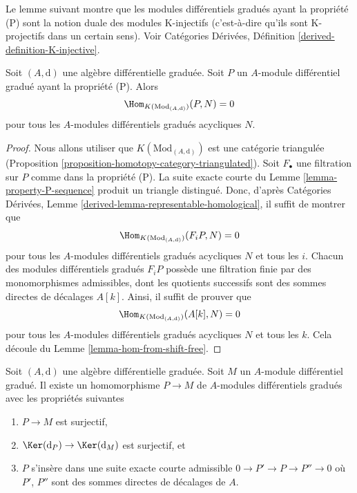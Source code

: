 \noindent
Le lemme suivant montre que les modules différentiels gradués ayant la propriété
(P) sont la notion duale des modules K-injectifs (c'est-à-dire qu'ils sont
K-projectifs dans un certain sens). Voir Catégories Dérivées, Définition
\ref{derived-definition-K-injective}.

\begin{lemma}
\label{lemma-property-P-K-projective}
Soit $(A, \text{d})$ une algèbre différentielle graduée. Soit $P$ un $A$-module
différentiel gradué ayant la propriété (P). Alors
$$
\Hom_{K(\text{Mod}_{(A, \text{d})})}(P, N) = 0
$$
pour tous les $A$-modules différentiels gradués acycliques $N$.
\end{lemma}

\begin{proof}
Nous allons utiliser que $K(\text{Mod}_{(A, \text{d})})$ est une catégorie
triangulée (Proposition \ref{proposition-homotopy-category-triangulated}). Soit
$F_\bullet$ une filtration sur $P$ comme dans la propriété (P). La suite exacte
courte du Lemme \ref{lemma-property-P-sequence} produit un triangle distingué.
Donc, d'après Catégories Dérivées, Lemme
\ref{derived-lemma-representable-homological}, il suffit de montrer que
$$
\Hom_{K(\text{Mod}_{(A, \text{d})})}(F_iP, N) = 0
$$
pour tous les $A$-modules différentiels gradués acycliques $N$ et tous les $i$.
Chacun des modules différentiels gradués $F_iP$ possède une filtration finie par
des monomorphismes admissibles, dont les quotients successifs sont des sommes directes
de décalages $A[k]$. Ainsi, il suffit de prouver que
$$
\Hom_{K(\text{Mod}_{(A, \text{d})})}(A[k], N) = 0
$$
pour tous les $A$-modules différentiels gradués acycliques $N$ et tous les $k$.
Cela découle du Lemme \ref{lemma-hom-from-shift-free}.
\end{proof}

\begin{lemma}
\label{lemma-good-quotient}
Soit $(A, \text{d})$ une algèbre différentielle graduée. Soit $M$ un $A$-module
différentiel gradué. Il existe un homomorphisme $P \to M$ de $A$-modules
différentiels gradués avec les propriétés suivantes
\begin{enumerate}
\item $P \to M$ est surjectif,
\item $\Ker(\text{d}_P) \to \Ker(\text{d}_M)$ est surjectif, et
\item $P$ s'insère dans une suite exacte courte admissible $0 \to P' \to P \to P''
\to 0$ où $P'$, $P''$ sont des sommes directes de décalages de $A$.
\end{enumerate}
\end{lemma}

